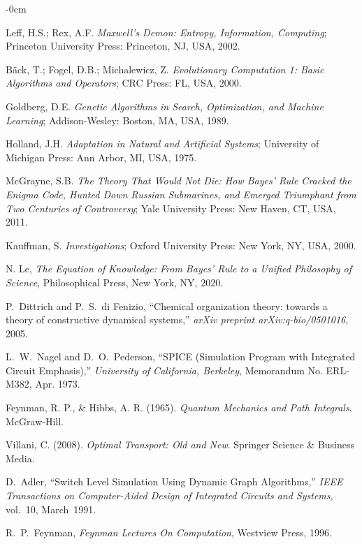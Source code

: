 \documentclass[entropy,article,submit,pdftex,moreauthors]{Definitions/mdpi}
\begin{document}
\begin{adjustwidth}{-\extralength}{0cm}
\begin{thebibliography}{999}
Leff, H.S.; Rex, A.F. \textit{Maxwell’s Demon: Entropy, Information, Computing}; Princeton University Press: Princeton, NJ, USA, 2002.

Bäck, T.; Fogel, D.B.; Michalewicz, Z. \textit{Evolutionary Computation 1: Basic Algorithms and Operators}; CRC Press: FL, USA, 2000.

Goldberg, D.E. \textit{Genetic Algorithms in Search, Optimization, and Machine Learning}; Addison-Wesley: Boston, MA, USA, 1989.

Holland, J.H. \textit{Adaptation in Natural and Artificial Systems}; University of Michigan Press: Ann Arbor, MI, USA, 1975.

McGrayne, S.B. \textit{The Theory That Would Not Die: How Bayes' Rule Cracked the Enigma Code, Hunted Down Russian Submarines, and Emerged Triumphant from Two Centuries of Controversy}; Yale University Press: New Haven, CT, USA, 2011.

Kauffman, S. \textit{Investigations}; Oxford University Press: New York, NY, USA, 2000.

 N. Le, \textit{The Equation of Knowledge: From Bayes’ Rule to a Unified Philosophy of Science}, Philosophical Press, New York, NY, 2020.

P.~Dittrich and P.~S.~di Fenizio, ``Chemical organization theory: towards a theory of constructive dynamical systems,'' \emph{arXiv preprint arXiv:q-bio/0501016}, 2005.


L.~W.~Nagel and D.~O.~Pederson, ``SPICE (Simulation Program with Integrated Circuit Emphasis),'' 
{\em University of California, Berkeley}, Memorandum No. ERL-M382, Apr. 1973.

Feynman, R. P., \& Hibbs, A. R. (1965). \textit{Quantum Mechanics and Path Integrals}. McGraw-Hill.

Villani, C. (2008). \textit{Optimal Transport: Old and New}. Springer Science \& Business Media.


 D.~Adler, ``Switch Level Simulation Using Dynamic Graph Algorithms,''
{\em IEEE Transactions on Computer-Aided Design of Integrated Circuits and Systems}, vol.~10, March~1991.

R.~P.~Feynman, {\em Feynman Lectures On Computation}, Westview Press, 1996.


\end{thebibliography}
\end{adjustwidth}
\end{document}
